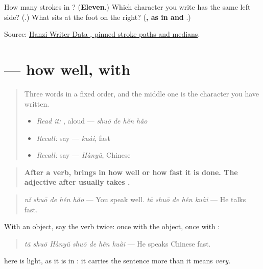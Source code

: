 \begin{tcolorbox}[breakable,colback=teal!4,colframe=teal!35!black,title={Before you move on}]
How many strokes in ? (\textbf{Eleven}.) Which character you write has the same left side? (\textbf{}.) What sits at the foot on the right? (\textbf{, as in  and }.)

Source: \href{https://raw.githubusercontent.com/chanind/hanzi-writer-data/68d10a4b21150cae5e1ebbd223eed289cf32d90c/data/\%E5\%BE\%97.json}{Hanzi Writer Data , pinned stroke paths and medians}.
\end{tcolorbox}
\section[\texorpdfstring{\zh{你说得很好} (nǐ shuō de hěn hǎo)}{你说得很好 (nǐ shuō de hěn hǎo)}]{ — how well, with }

\label{lesson:ZH-C152-de-grammar}



\begin{quote}
Three words in a fixed order, and the middle one is the character you have written.

\begin{itemize}
\raggedright
  \item \emph{Read it:} , aloud — \emph{shuō de hěn hǎo}
  \item \emph{Recall:} say  — \emph{kuài}, fast
  \item \emph{Recall:} say  — \emph{Hànyǔ}, Chinese
\end{itemize}
\end{quote}

\begin{grammarlens}[title={Grammar Lens: the verb, \zh{得}, then how well}]
\begin{quote}
\textbf{After a verb,  brings in how well or how fast it is done. The adjective after  usually takes .}
\end{quote}

\begin{quote}
\textbf{} \emph{nǐ shuō de hěn hǎo} — You speak well. \textbf{} \emph{tā shuō de hěn kuài} — He talks fast.
\end{quote}

With an object, say the verb twice: once with the object, once with :

\begin{quote}
\textbf{} \emph{tā shuō Hànyǔ shuō de hěn kuài} — He speaks Chinese fast.
\end{quote}

 here is light, as it is in : it carries the sentence more than it means \emph{very}.
\end{grammarlens}

